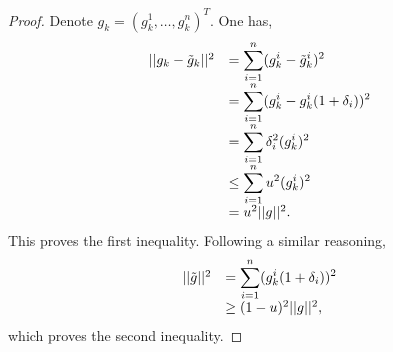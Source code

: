 \documentclass{article}[12pt]
\begin{document}
	\begin{proof}
		Denote $g_k = (g_k^1,\dots,g_k^n)^T$. One has,
		\begin{equation}
		\begin{array}{ll}
			||g_k-\tilde{g}_k||^2 & =  \displaystyle  \sum_{i=1}^n (g_k^i-\tilde{g}_k^i)^2 \\
			& = \displaystyle \sum_{i=1}^n (g_k^i-g_k^i(1+\delta_i))^2\\
			&  =  \displaystyle \sum_{i=1}^n \delta_i^2  (g_k^i)^2 \\
			& \leq \displaystyle \sum_{i=1}^n u^2 (g_k^i)^2\\
			& = u^2||g||^2.\\
		\end{array}
	\end{equation}
	This proves the first inequality. Following a similar reasoning,
	\begin{equation}
		\begin{array}{ll}
			||\tilde{g}||^2 & =   \displaystyle  \sum_{i=1}^n (g_k^i(1+\delta_i))^2 \\
			& \geq (1-u)^2||g||^2,\\
		\end{array}
	\end{equation}
	which proves the second inequality.
	\end{proof}
	
	
\end{document}
